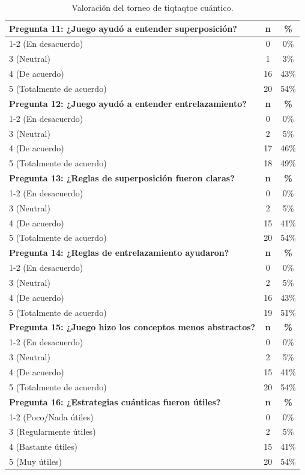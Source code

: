 \documentclass[10pt,a4paper]{article}
\begin{document}
\begin{table}[h!]
\centering
\caption{Valoración del torneo de tiqtaqtoe cuántico.}
\begin{tabular}{|l|c|c|}
\hline
\textbf{Pregunta 11: ¿Juego ayudó a entender superposición?} & \textbf{n} & \textbf{\%} \\
\hline
1-2 (En desacuerdo) & 0 & 0\% \\
3 (Neutral) & 1 & 3\% \\
4 (De acuerdo) & 16 & 43\% \\
5 (Totalmente de acuerdo) & 20 & 54\% \\
\hline
\textbf{Pregunta 12: ¿Juego ayudó a entender entrelazamiento?} & \textbf{n} & \textbf{\%} \\
\hline
1-2 (En desacuerdo) & 0 & 0\% \\
3 (Neutral) & 2 & 5\% \\
4 (De acuerdo) & 17 & 46\% \\
5 (Totalmente de acuerdo) & 18 & 49\% \\
\hline
\textbf{Pregunta 13: ¿Reglas de superposición fueron claras?} & \textbf{n} & \textbf{\%} \\
\hline
1-2 (En desacuerdo) & 0 & 0\% \\
3 (Neutral) & 2 & 5\% \\
4 (De acuerdo) & 15 & 41\% \\
5 (Totalmente de acuerdo) & 20 & 54\% \\
\hline
\textbf{Pregunta 14: ¿Reglas de entrelazamiento ayudaron?} & \textbf{n} & \textbf{\%} \\
\hline
1-2 (En desacuerdo) & 0 & 0\% \\
3 (Neutral) & 2 & 5\% \\
4 (De acuerdo) & 16 & 43\% \\
5 (Totalmente de acuerdo) & 19 & 51\% \\
\hline
\textbf{Pregunta 15: ¿Juego hizo los conceptos menos abstractos?} & \textbf{n} & \textbf{\%} \\
\hline
1-2 (En desacuerdo) & 0 & 0\% \\
3 (Neutral) & 2 & 5\% \\
4 (De acuerdo) & 15 & 41\% \\
5 (Totalmente de acuerdo) & 20 & 54\% \\
\hline
\textbf{Pregunta 16: ¿Estrategias cuánticas fueron útiles?} & \textbf{n} & \textbf{\%} \\
\hline
1-2 (Poco/Nada útiles) & 0 & 0\% \\
3 (Regularmente útiles) & 2 & 5\% \\
4 (Bastante útiles) & 15 & 41\% \\
5 (Muy útiles) & 20 & 54\% \\
\hline
\end{tabular}
\end{table}
\end{document}

